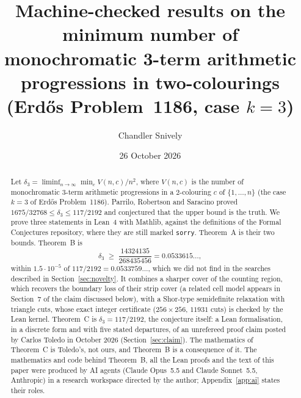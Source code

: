 \documentclass[11pt]{amsart}
\title[Results for Erd\H{o}s Problem 1186, $k=3$]{Machine-checked results on the minimum number of monochromatic 3-term arithmetic progressions in two-colourings (Erd\H{o}s Problem~1186, case $k=3$)}
\author{Chandler Snively}
\date{26 October 2026}
\theoremstyle{remark}
\newcommand{\mono}{V}
\begin{document}
\begin{abstract}
Let $\delta_3=\liminf_{n\to\infty}\min_c \mono(n,c)/n^2$, where $\mono(n,c)$ is the number of monochromatic 3-term arithmetic
progressions in a $2$-colouring $c$ of $\{1,\dots,n\}$ (the case $k=3$ of Erd\H{o}s Problem~1186). Parrilo, Robertson and Saracino proved
$1675/32768\le\delta_3\le117/2192$ and conjectured that the upper bound is the truth. We prove three statements in Lean~4 with Mathlib,
against the definitions of the Formal Conjectures repository, where they are still marked \texttt{sorry}. Theorem~A is their two bounds.
Theorem~B is
\[\delta_3\;\ge\;\frac{14324135}{268435456}=0.0533615\ldots,\]
within $1.5\cdot10^{-5}$ of $117/2192=0.0533759\ldots$, which we did not find in the searches described in Section~\ref{sec:novelty}. It
combines a sharper cover of the counting region, which recovers the boundary loss of their strip cover (a related cell model appears in
Section~7 of the claim discussed below), with a Shor-type semidefinite relaxation with triangle cuts, whose exact integer certificate
($256\times256$, $11931$ cuts) is checked by the Lean kernel. Theorem~C is $\delta_3=117/2192$, the conjecture itself: a Lean
formalisation, in a discrete form and with five stated departures, of an unrefereed proof claim posted by Carlos Toledo in October 2026
(Section~\ref{sec:claim}). The mathematics of Theorem~C is Toledo's, not ours, and Theorem~B is a consequence of it.
The mathematics and code behind Theorem~B, all the Lean proofs and the text of this paper were produced by AI agents (Claude Opus~5.5 and
Claude Sonnet~5.5, Anthropic) in a research workspace directed by the author; Appendix~\ref{app:ai} states their roles.
\end{abstract}

\maketitle
\end{document}
